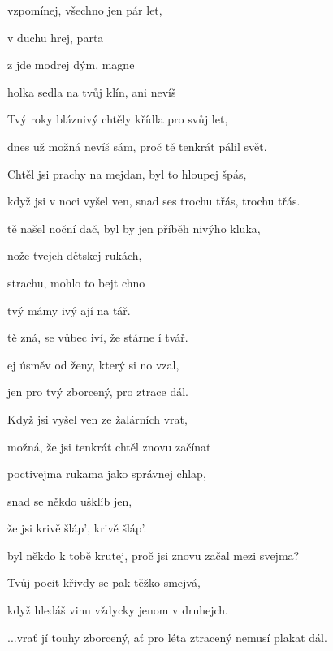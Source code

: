 


\zs
{} vzpomínej,  všechno jen pár let,

 v duchu hrej,  parta 

z  jde modrej dým,  magne

holka sedla na tvůj klín,  ani 
nevíš     
\ks

\zs
Tvý roky bláznivý chtěly křídla pro svůj let,

dnes už možná nevíš sám, proč tě tenkrát pálil svět.

Chtěl jsi prachy na mejdan, byl to hloupej špás,

když jsi v noci vyšel ven, snad ses trochu třás, trochu třás.
\ks

\zs
{} tě našel noční dač, byl by  jen příběh 
nivýho kluka,

 nože  tvejch dětskej rukách,

 strachu, mohlo to bejt chno  
\ks

\zr
{} tvý mámy ivý ají na tář.  


 tě zná, se vůbec iví, že stárne í tvář.
 

ej úsměv od ženy, který si no vzal,

jen pro tvý  zborcený, pro  ztrace  dál.
\kr

\zs
Když jsi vyšel ven ze žalárních vrat,

možná, že jsi tenkrát chtěl znovu začínat

poctivejma rukama jako správnej chlap,

snad se někdo ušklíb jen,

že jsi krivě šláp', krivě šláp'.
\ks

\zs
{} byl někdo k tobě krutej, proč jsi znovu začal mezi svejma?

Tvůj pocit křivdy se pak těžko smejvá,

když hledáš vinu vždycky jenom v druhejch.
\ks

\zr
...vrať jí touhy zborcený, ať pro léta ztracený nemusí plakat dál.
\kr


\kp
